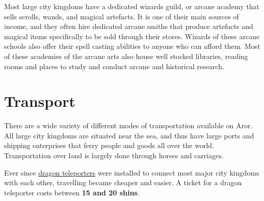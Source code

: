 Most large city kingdoms have a dedicated wizards guild, or arcane academy
that sells scrolls, wands, and magical artefacts. It is one of their main
sources of income, and they often hire dedicated arcane smiths that produce
artefacts and magical items specifically to be sold through their stores.
Wizards of these arcane schools also offer their spell casting abilities to
anyone who can afford them. Most of these academies of the arcane arts also
house well stocked libraries, reading rooms and places to study and conduct
arcane and historical research.

\section{Transport}
\label{sec:Transport}

There are a wide variety of different modes of transportation available on
Aror. All large city kingdoms are situated near the sea, and thus have large
ports and shipping enterprises that ferry people and goods all over the
world. Transportation over land is largely done through horses and carriages.

Ever since \hyperref[sec:Dragon Teleporter]{dragon teleporters} were installed
to connect most major city kingdoms with each other, travelling became cheaper
and easier. A ticket for a dragon teleporter costs between \textbf{15 and 20
  shins}.


